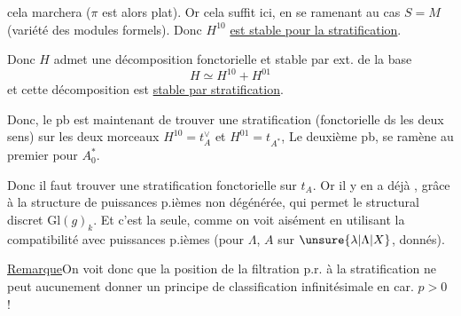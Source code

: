 cela marchera ($\pi$ est alors  plat). Or cela suffit ici,
en se ramenant au cas $S=M$ (variété des modules
formels). Donc $H^{10}$ \uline{est stable pour la stratification}.

Donc $H$ admet une décomposition fonctorielle
et stable par ext. de la base
\[
H\simeq H^{10}+H^{01}
\]
et cette décomposition est \uline{stable par stratification}.

Donc, le pb est maintenant de trouver une
stratification  (fonctorielle ds les deux sens)
sur les deux morceaux $H^{10}=t_A^\vee$ et $H^{01}=t_{A^*}$,
Le deuxième pb,  se ramène au premier pour $A_0^*$.

Donc il faut trouver une stratification fonctorielle sur
$t_A$. Or il y en a déjà , grâce à la structure
de puissances p.ièmes non dégénérée, qui
permet  le  structural
discret $\mathrm{Gl}(g)_k$. Et c'est la seule,  comme on voit
aisément en utilisant la compatibilité avec 
puissances p.ièmes (pour $\Lambda$, $A$ sur $\unsure{\lambda|\Lambda|X}$, donnés).

\uline{Remarque}\quad On voit donc que la position de
la filtration p.r. à la stratification ne peut aucunement
donner un principe de classification  infinitésimale en car. $p>0$ !

